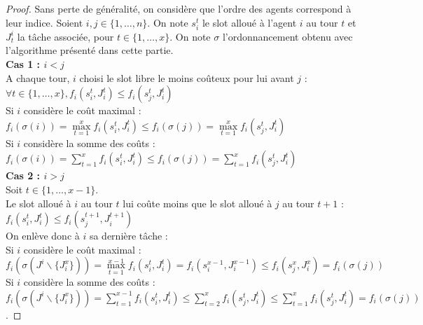 \documentclass[12pt]{article}
\theoremstyle{definition}
\begin{document}
\begin{proof}
Sans perte de généralité, on considère que l'ordre des agents correspond à leur indice. Soient $i, j \in \{1, \dots, n\}$. On note $s_i^t$ le slot alloué à l'agent $i$ au tour $t$ et $J^i_t$ la tâche associée, pour $t\in\{1,\dots,x\}$. On note $\sigma$ l'ordonnancement obtenu avec l'algorithme présenté dans cette partie.\\
\textbf{Cas 1 : $i<j$}\\
A chaque tour, $i$ choisi le slot libre le moins coûteux pour lui avant $j$ :\\
 $\forall t\in \{1, \dots, x\}, f_{i}(s^t_{i}, J^t_{i})\leq f_{i}(s^t_{j}, J^t_{i})$\\
 Si $i$ considère le coût maximal : $f_{i}(\sigma(i)) = \max\limits_{t = 1}^x f_{i}(s^t_{i}, J^t_{i}) \leq f_{i}(\sigma(j)) = \max\limits_{t = 1}^x f_{i}(s^t_{j}, J^t_{i})$\\
 Si $i$ considère la somme des coûts : $f_{i}(\sigma(i)) = \sum\limits_{t = 1}^x f_{i}(s^t_{i}, J^t_{i})\leq f_{i}(\sigma(j)) = \sum\limits_{t = 1}^x f_{i}(s^t_{j}, J^t_{i})$\\
\textbf{Cas 2 : $i>j$}\\
Soit $t\in\{1,\dots,x-1\}$.\\
Le slot alloué à $i$ au tour $t$ lui coûte moins que le slot alloué à $j$ au tour $t+1$ : \\
$f_{i}(s^t_{i}, J^t_{i})\leq f_{i}(s^{t+1}_{j}, J^{t+1}_{i})$\\
On enlève donc à $i$ sa dernière tâche :\\
Si $i$ considère le coût maximal : \\
$f_{i}(\sigma(J^{i}\backslash\{J_{i}^x\})) = \max\limits_{t = 1}^{x-1} f_{i}(s^t_{i}, J^t_{i}) = f_{i}(s^{x-1}_{i}, J^{x-1}_{i}) \leq f_{i}(s^x_{j}, J^x_{i}) = f_{i}(\sigma(j))$\\
Si $i$ considère la somme des coûts : \\
$f_{i}(\sigma(J^{i}\backslash\{J_{i}^x\})) = \sum\limits_{t = 1}^{x-1} f_{i}(s^t_{i}, J^t_{i}) \leq \sum\limits_{t = 2}^{x} f_{i}(s^t_{j}, J^t_{i}) \leq \sum\limits_{t = 1}^{x} f_{i}(s^t_{j}, J^t_{i}) = f_{i}(\sigma(j))$.
\end{proof}
\end{document}
